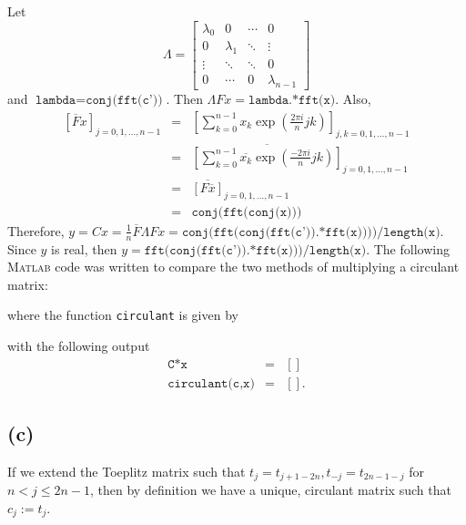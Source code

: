 \documentclass[11pt]{article}
\newcommand{\MATLAB}{\textsc{Matlab}\xspace}
\theoremstyle{definition}
\theoremstyle{remark}
\newcommand{\newpart}{\vspace{-0.5\baselineskip}\hrulefill\vspace{-1.3\baselineskip}}
\theoremstyle{plain}
\begin{document}
Let 
\begin{equation*}
  \Lambda=\left[
    \begin{array}{cccc}
      \lambda_0 & 0 & \cdots & 0\\
      0 & \lambda_1 & \ddots & \vdots\\
      \vdots & \ddots & \ddots & 0\\
      0 & \cdots & 0 & \lambda_{n-1}
    \end{array}
  \right]
\end{equation*}
and $\texttt{lambda}=\texttt{conj(fft(c'))}$. Then $\Lambda Fx=\texttt{lambda.*fft(x)}$. Also,
\begin{eqnarray*}
  \left[\overline{F}x\right]_{j=0,1,\dots,n-1}&=&\left[\sum_{k=0}^{n-1}x_k\exp\left(\frac{2\pi i}{n}jk\right)\right]_{j,k=0,1,\dots,n-1}\\
                                              &=&\overline{\left[\sum_{k=0}^{n-1}\overline{x_k}\exp\left(\frac{-2\pi i}{n}jk\right)\right]}_{j=0,1,\dots,n-1}\\
                                              &=&\overline{\left[F\overline{x}\right]}_{j=0,1,\dots,n-1}\\
                                              &=&\texttt{conj(fft(conj(x)))}
\end{eqnarray*}
Therefore, $y=Cx=\frac{1}{n}\overline{F}\Lambda Fx=\texttt{conj(fft(conj(fft(c')).*fft(x))))/length(x)}$. Since $y$ is real, then $y=\texttt{fft(conj(fft(c')).*fft(x)))/length(x)}$. The following \MATLAB code was written to compare the two methods of multiplying a circulant matrix:

where the function \texttt{circulant} is given by

with the following output
\begin{eqnarray*}
  \texttt{C*x}&=&\left[\right]\\
  \texttt{circulant(c,x)}&=&\left[\right].
\end{eqnarray*}

\newpart
\subsection*{(c)}
If we extend the Toeplitz matrix such that $t_j=t_{j+1-2n},t_{-j}=t_{2n-1-j}$ for $n< j\leq 2n-1$, then by definition we have a unique, circulant matrix such that $c_j:=t_j$.
\end{document}

